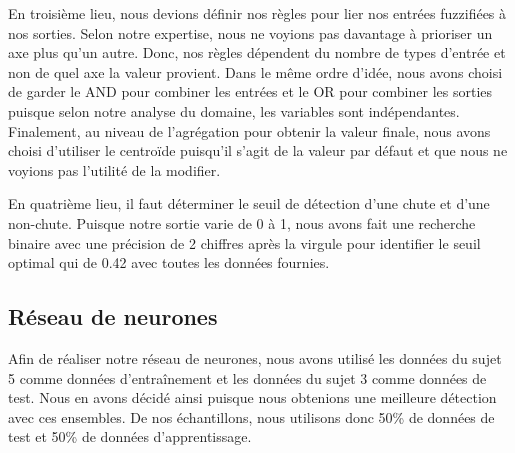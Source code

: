 \documentclass[12pt,letterpaper]{article}
\begin{document}
En troisième lieu, nous devions définir nos règles pour lier nos entrées fuzzifiées à nos sorties. Selon notre expertise, nous ne voyions pas davantage à prioriser un axe plus qu'un autre. Donc, nos règles dépendent du nombre de types d'entrée et non de quel axe la valeur provient. Dans le même ordre d'idée, nous avons choisi de garder le AND pour combiner les entrées et le OR pour combiner les sorties puisque selon notre analyse du domaine, les variables sont indépendantes. Finalement, au niveau de l'agrégation pour obtenir la valeur finale, nous avons choisi d'utiliser le centroïde puisqu'il s'agit de la valeur par défaut et que nous ne voyions pas l'utilité de la modifier.


En quatrième lieu, il faut déterminer le seuil de détection d'une chute et d'une non-chute. Puisque notre sortie varie de 0 à 1, nous avons fait une recherche binaire avec une précision de 2 chiffres après la virgule pour identifier le seuil optimal qui de 0.42 avec toutes les données fournies.

\subsection{Réseau de neurones} %

Afin de réaliser notre réseau de neurones, nous avons utilisé les données du sujet 5 comme données d'entraînement et les données du sujet 3 comme données de test. Nous en avons décidé ainsi puisque nous obtenions une meilleure détection avec ces ensembles. De nos échantillons, nous utilisons donc 50\%  de données de test et 50\% de données d'apprentissage.
\end{document}
